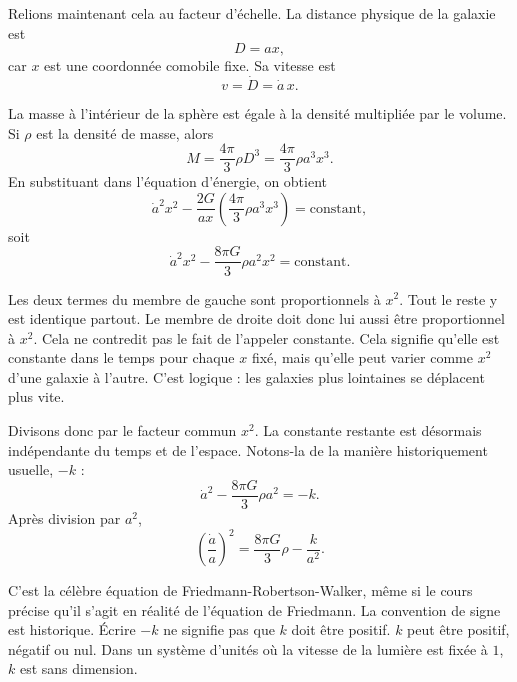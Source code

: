 Relions maintenant cela au facteur d’échelle. La distance physique de la galaxie est
\begin{equation}
D=ax,
\end{equation}
car \(x\) est une coordonnée comobile fixe. Sa vitesse est
\begin{equation}
v=\dot D=\dot a\,x.
\end{equation}

La masse à l’intérieur de la sphère est égale à la densité multipliée par le volume. Si \(\rho\) est la densité de masse, alors
\begin{equation}
M=\frac{4\pi}{3}\rho D^3=\frac{4\pi}{3}\rho a^3x^3.
\end{equation}
En substituant dans l’équation d’énergie, on obtient
\begin{equation}
\dot a^2x^2-\frac{2G}{ax}\left(\frac{4\pi}{3}\rho a^3x^3\right)=\text{constant},
\end{equation}
soit
\begin{equation}
\dot a^2x^2-\frac{8\pi G}{3}\rho a^2x^2=\text{constant}.
\end{equation}

Les deux termes du membre de gauche sont proportionnels à \(x^2\). Tout le reste y est identique partout. Le membre de droite doit donc lui aussi être proportionnel à \(x^2\). Cela ne contredit pas le fait de l’appeler constante. Cela signifie qu’elle est constante dans le temps pour chaque \(x\) fixé, mais qu’elle peut varier comme \(x^2\) d’une galaxie à l’autre. C’est logique : les galaxies plus lointaines se déplacent plus vite.

Divisons donc par le facteur commun \(x^2\). La constante restante est désormais indépendante du temps et de l’espace. Notons-la de la manière historiquement usuelle, \(-k\) :
\begin{equation}
\dot a^2-\frac{8\pi G}{3}\rho a^2=-k.
\end{equation}
Après division par \(a^2\),
\begin{equation}
\left(\frac{\dot a}{a}\right)^2=\frac{8\pi G}{3}\rho-\frac{k}{a^2}.
\end{equation}

C’est la célèbre équation de Friedmann-Robertson-Walker, même si le cours précise qu’il s’agit en réalité de l’équation de Friedmann. La convention de signe est historique. Écrire \(-k\) ne signifie pas que \(k\) doit être positif. \(k\) peut être positif, négatif ou nul. Dans un système d’unités où la vitesse de la lumière est fixée à \(1\), \(k\) est sans dimension.

